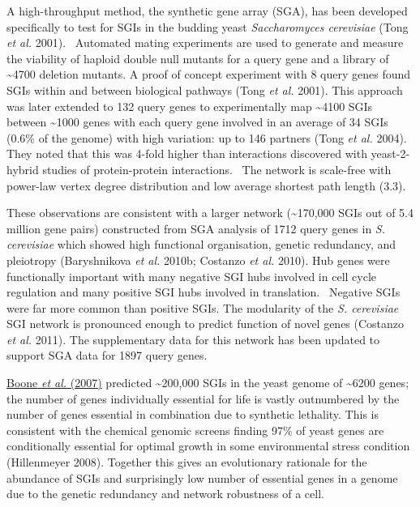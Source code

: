 A high-throughput method, the synthetic gene array (SGA), has been
developed specifically to test for SGIs in the budding yeast
\textit{Saccharomyces cerevisiae} (Tong\textit{ et al.} 2001).
\ Automated mating experiments are used to generate and measure the
viability of haploid double null mutants for a query gene and a library
of \~{}4700 deletion mutants. A proof of concept experiment with 8
query genes found SGIs within and between biological pathways
(Tong\textit{ et al.} 2001). This approach was later extended to 132
query genes to experimentally map \~{}4100 SGIs between \~{}1000 genes
with each query gene involved in an average of 34 SGIs (0.6\% of the
genome) with high variation: up to 146 partners (Tong\textit{ et al.}
2004). They noted that this was 4-fold higher than interactions
discovered with yeast-2-hybrid studies of protein-protein interactions.
\ The network is scale-free with power-law vertex degree distribution
and low average shortest path length (3.3). 


These observations are consistent with a larger network (\~{}170,000
SGIs out of 5.4 million gene pairs) constructed from SGA analysis of
1712 query genes in \textit{S. cerevisiae} which showed high functional
organisation, genetic redundancy, and pleiotropy (Baryshnikova\textit{
et al.} 2010b; Costanzo\textit{ et al.} 2010). Hub genes were
functionally important with many negative SGI hubs involved in cell
cycle regulation and many positive SGI hubs involved in translation.
\ Negative SGIs were far more common than positive SGIs. The
modularity of the \textit{S. cerevisiae} SGI network is pronounced
enough to predict function of novel genes (Costanzo\textit{ et al.}
2011). The supplementary data for this network has been updated to
support SGA data for 1897 query genes. 


\hyperlink{ENREF15}{Boone}\hyperlink{ENREF15}{\textit{ et
al.}}\hyperlink{ENREF15}{ (2007)} predicted \~{}200,000 SGIs in the
yeast genome of \~{}6200 genes; the number of genes individually
essential for life is vastly outnumbered by the number of genes
essential in combination due to synthetic lethality. This is
consistent with the chemical genomic screens finding 97\% of yeast
genes are conditionally essential for optimal growth in some
environmental stress condition (Hillenmeyer 2008). Together this
gives an evolutionary rationale for the abundance of SGIs and
surprisingly low number of essential genes in a genome due to the
genetic redundancy and network robustness of a cell. 


